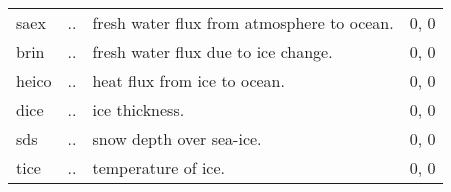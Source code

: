 \begin{tabular}{llll}
saex    &    ..            &    fresh water flux from atmosphere to ocean.      &       0, 0  \\
brin    &    ..            &    fresh water flux due to ice change.             &	0, 0  \\
heico   &    ..            &    heat flux from ice to ocean.                    &       0, 0  \\
dice    &    ..            &    ice thickness.                                  &       0, 0  \\ 
sds     &    ..            &    snow depth over sea-ice.                        &	0, 0  \\
tice    &    ..            &    temperature of ice.                             &	0, 0  \\ \hline
\end{tabular}
\\
\baselineskip=14pt
	    
	    
\newpage
